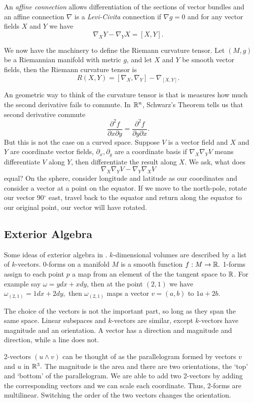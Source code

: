 An \emph{affine connection} allows differentiation of the sections of vector bundles
and an affine connection $\nabla$ is a \emph{Levi-Civita} connection
if $\nabla g=0$ and for any vector fields $X$ and $Y$ we have
$$\nabla_XY-\nabla_Y X = [X,Y].$$

We now have the machinery to define the Riemann curvature tensor.
Let $(M,g)$ be a Riemannian manifold with metric $g$, and let $X$ and $Y$ be
smooth vector fields, then the Riemann curvature tensor is 
$$R(X,Y)=[\nabla _X,\nabla_Y]-\nabla_{[X,Y]}.$$



An geometric way to think of the curvature tensor is that is measures
 how much the second derivative fails
to commute. In $\mathbb{R}^n$, Schwarz's Theorem tells us that second derivative commute
$$\frac{\partial^2 f}{\partial x\partial y}=\frac{\partial^2 f}{\partial y\partial x}.$$
But this is not the case on a curved space. Suppose $V$ is a vector field and $X$ and $Y$
are coordinate vector fields, $\partial_x,\partial_y$ are
a coordinate basis if $\nabla_X \nabla_Y V$ means differentiate $V$ along $Y$, then differentiate
the result along $X.$
We ask, what does 
$$\nabla_X\nabla_YV-\nabla_Y\nabla_X V$$
equal?
On the sphere, consider longitude and latitude as our coordinates and consider
a vector at a point on the equator. If we move to the north-pole, rotate our vector 90$^\circ$ east,
travel back to the equator and return along the equator to our original point, our vector will have rotated.


\subsection{Exterior Algebra}
Some ideas of exterior algebra in \cite{Crane:2013}. $k$-dimensional volumes are described by a list of $k$-vectors.
0-forms on a manifold $M$ is a smooth function $f:M\rightarrow \mathbb{R}.$
1-forms assign to each point $p$ a map from an element of the the tangent space to $\mathbb{R}$.
For example say $\omega = ydx+xdy$, then at the point $(2,1)$ we have
$\omega_{(2,1)}=1dx+2dy,$ then $\omega_{(2,1)}$ maps a vector $v=(a,b)$ to
$1a+2b.$

The choice of the vectors is not the important part, so long as they span the same space.
Linear subspaces and $k$-vectors are similar, except $k$-vectors have magnitude and an orientation.
A vector has a direction and magnitude and direction, while a line does not.

2-vectors $(u\land v)$ can be thought of as the parallelogram formed by vectors $v$ and $u$ in $\mathbb{R}^3.$
The magnitude is the area and there are two orientations, the `top' and `bottom' of the parallelogram.
We are able to add two 2-vectors by adding the corresponding vectors and we can scale each coordinate.
Thus, 2-forms are multilinear.
Switching the order of the two vectors changes the orientation.

